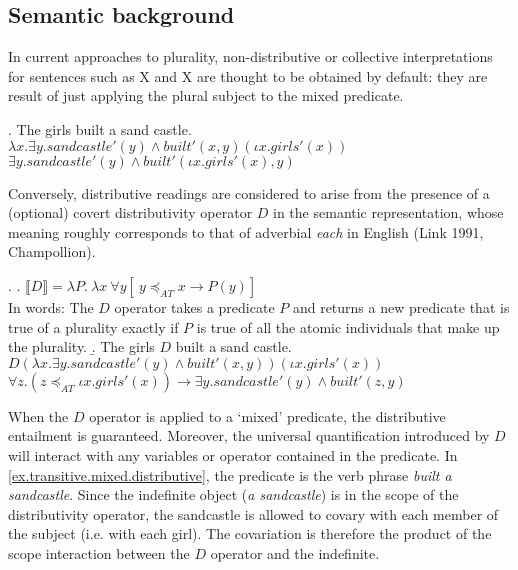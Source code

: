 
\subsection{Semantic background}

In current approaches to plurality, non-distributive or collective interpretations for sentences such as X and X are thought to be obtained by default: they are result of just applying the plural subject to the mixed predicate. 

\ex. The girls built a sand castle.\\
    $\lambda x.\exists y.\mathit{sand castle}'(y) \wedge \textit{built}'(x,y)(\iota x.\mathit{girls}'(x))$\\
        $\exists y.\mathit{sandcastle}'(y) \wedge \textit{built}'(\iota x.\mathit{girls}'(x),y)$

Conversely, distributive readings are considered to arise from the presence of a (optional) covert distributivity operator $D$ in the semantic representation, whose meaning roughly corresponds to that of adverbial \textit{each} in English (Link 1991, Champollion). 

\ex.
\a.  $ \llbracket D \rrbracket = \lambda P.  \ \lambda x \ \forall y[\ y \preceq_{AT} x \rightarrow P(y)]$ \\
In words: The $D$ operator takes a predicate $P$ and returns a new predicate that is true of a plurality exactly if $P$ is true of all the atomic individuals that make up the plurality. 
\b. The girls $D$ built a sand castle.\label{ex.transitive.mixed.distributive} \\ 
    $D(\lambda x.\exists y.\mathit{sandcastle}'(y) \wedge \textit{built}'(x,y))(\iota x.\mathit{girls}'(x))$\\
    $\forall z . (z\preceq_{AT}\iota x.\mathit{girls}'(x)) \rightarrow \exists y.\mathit{sand castle}'(y) \wedge \textit{built}'(z,y)$

When the $D$ operator is applied to a `mixed' predicate, the distributive entailment is guaranteed. Moreover, the universal quantification introduced by $D$ will interact with any variables or operator contained in the predicate. In \ref{ex.transitive.mixed.distributive}, the predicate is the verb phrase \textit{built a sandcastle}. Since the indefinite object (\textit{a sandcastle}) is in the scope of the distributivity operator, the sandcastle is allowed to covary with each member of the subject (i.e. with each girl). The covariation is therefore the product of the scope interaction between the $D$ operator and the indefinite. 


